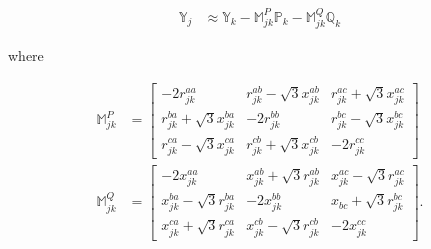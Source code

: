 \begin{align}
	\mathbb{Y}_{j} &\approx \mathbb{Y}_{k} - \mathbb{M}_{jk}^{P} \mathbb{P}_{k} - \mathbb{M}_{jk}^{Q} \mathbb{Q}_{k} \label{eq:mag_8}
\end{align}

\noindent where


\begin{align}
	\mathbb{M}_{jk}^{P} &=
	\begin{bmatrix}
		-2 r_{jk}^{aa} & r_{jk}^{ab} - \sqrt{3} x_{jk}^{ab} & r_{jk}^{ac} + \sqrt{3} x_{jk}^{ac} \\
		r_{jk}^{ba} + \sqrt{3} x_{jk}^{ba} & -2 r_{jk}^{bb} & r_{jk}^{bc} - \sqrt{3} x_{jk}^{bc} \\
		r_{jk}^{ca} - \sqrt{3} x_{jk}^{ca} & r_{jk}^{cb} + \sqrt{3} x_{jk}^{cb} & -2 r_{jk}^{cc}
	\end{bmatrix} \label{eq:M}\\
	\mathbb{M}_{jk}^{Q} &=
	\begin{bmatrix}
		-2 x_{jk}^{aa} & x_{jk}^{ab} + \sqrt{3} r_{jk}^{ab} & x_{jk}^{ac} - \sqrt{3} r_{jk}^{ac} \\
		x_{jk}^{ba} -\sqrt{3} r_{jk}^{ba} & -2 x_{jk}^{bb} & x_{bc} + \sqrt{3} r_{jk}^{bc}\\
		x_{jk}^{ca} + \sqrt{3} r_{jk}^{ca} & x_{jk}^{cb} -\sqrt{3} r_{jk}^{cb} & -2 x_{jk}^{cc}
	\end{bmatrix} \label{eq:N}.
\end{align}


